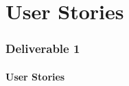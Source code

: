 \documentclass[12pt]{article}
\begin{document}
\renewcommand{\partname}{Phase}

\newcommand{\Requirement}[1] {
   \noindent \textbf{Requirement:} #1
}

\newcommand{\Feature}[1]{ 
   \noindent \textbf{Feature:} #1
}

\newcommand{\CFeature}[4]{
\noindent \textbf{Connextra Feature:}
	\begin{quote}
	\begin{tabular}{rl}
	\textbf{AS A} & #1\\
	\textbf{SO THAT \uppercase{#2}} & #3\\
	\textbf{\uppercase{#2} WANT TO} & #4  
	\end{tabular}
	\end{quote}
}

\newcommand{\GivenSc} {
	\noindent \textbf{GIVEN:}
	}
	
\newcommand{\WhenSc} {
	\noindent \textbf{WHEN:}
	}
	
\newcommand{\AndSc} {
	\noindent \textbf{AND:}
	}
	
\newcommand{\ThenSc} {
	\noindent \textbf{THEN:}
	}




\pagebreak
\setcounter{part}{1}
\setcounter{section}{1}
\setcounter{subsection}{0}
\part{User Stories}
\section*{Deliverable 1}
\subsection{User Stories}
\end{document}
